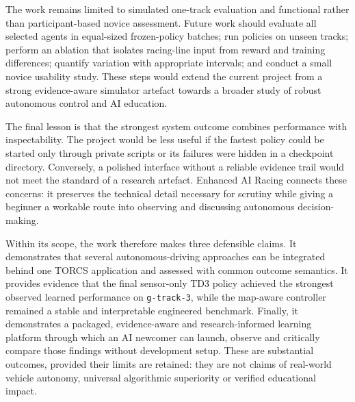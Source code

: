 The work remains limited to simulated one-track evaluation and functional rather than participant-based novice assessment. Future work should evaluate all selected agents in equal-sized frozen-policy batches; run policies on unseen tracks; perform an ablation that isolates racing-line input from reward and training differences; quantify variation with appropriate intervals; and conduct a small novice usability study. These steps would extend the current project from a strong evidence-aware simulator artefact towards a broader study of robust autonomous control and AI education.

The final lesson is that the strongest system outcome combines performance with inspectability. The project would be less useful if the fastest policy could be started only through private scripts or its failures were hidden in a checkpoint directory. Conversely, a polished interface without a reliable evidence trail would not meet the standard of a research artefact. Enhanced AI Racing connects these concerns: it preserves the technical detail necessary for scrutiny while giving a beginner a workable route into observing and discussing autonomous decision-making.

Within its scope, the work therefore makes three defensible claims. It demonstrates that several autonomous-driving approaches can be integrated behind one TORCS application and assessed with common outcome semantics. It provides evidence that the final sensor-only TD3 policy achieved the strongest observed learned performance on \texttt{g-track-3}, while the map-aware controller remained a stable and interpretable engineered benchmark. Finally, it demonstrates a packaged, evidence-aware and research-informed learning platform through which an AI newcomer can launch, observe and critically compare those findings without development setup. These are substantial outcomes, provided their limits are retained: they are not claims of real-world vehicle autonomy, universal algorithmic superiority or verified educational impact.


\printbibliography[heading=bibintoc,title={References}]



